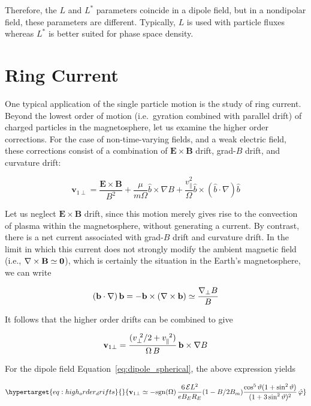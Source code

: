 \documentclass[
  notoc %
]{tufte-book}
\begin{document}
Therefore, the \(L\) and \(L^\ast\) parameters coincide in a dipole
field, but in a nondipolar field, these parameters are different.
Typically, \(L\) is used with particle fluxes whereas \(L^\ast\) is
better suited for phase space density.

\hypertarget{ring-current}{%
\section{Ring Current}\label{ring-current}}

One typical application of the single particle motion is the study of
ring current. Beyond the lowest order of motion (i.e.~gyration combined
with parallel drift) of charged particles in the magnetosphere, let us
examine the higher order corrections. For the case of non-time-varying
fields, and a weak electric field, these corrections consist of a
combination of \(\mathbf{E}\times\mathbf{B}\) drift, grad-\(B\) drift,
and curvature drift:

\[
\mathbf{v}_{1\perp} = \frac{\mathbf{E}\times\mathbf{B}}{B^2} + \frac{\mu}{m\Omega}\hat{b}\times\nabla B + \frac{v_\parallel^2}{\Omega}\hat{b}\times(\hat{b}\cdot\nabla)\hat{b}
\]

Let us neglect \(\mathbf{E}\times\mathbf{B}\) drift, since this motion
merely gives rise to the convection of plasma within the magnetosphere,
without generating a current. By contrast, there is a net current
associated with grad-\(B\) drift and curvature drift. In the limit in
which this current does not strongly modify the ambient magnetic field
(i.e., \(\nabla\times\mathbf{B} \simeq {\bf0}\)), which is certainly the
situation in the Earth's magnetosphere, we can write

\[
({\bf b}\cdot\nabla)\,{\bf b} =-{\bf b}\times(\nabla\times {\bf b})\simeq \frac{\nabla_\perp B}{B}
\]

It follows that the higher order drifts can be combined to give

\[
{\bf v}_{1\perp} = \frac{(v_\perp^{~2}/2+v_\parallel^{~2})}{{\Omega}\,B}\, {\bf b}\times\nabla B
\]

For the dipole field Equation~\ref{eq:dipole_spherical}, the above
expression yields

\begin{equation}\protect\hypertarget{eq:high_order_drifts}{}{
{\bf v}_{1\perp} \simeq -{\rm sgn}({\Omega})\,\frac{6\,{\cal E} L^2}{eB_E R_E}(1-B/2B_m)\frac{\cos^5\vartheta(1+\sin^2\vartheta)}{(1+3\sin^2\vartheta)^2}\,\hat{\varphi}
}\label{eq:high_order_drifts}\end{equation}
\end{document}
